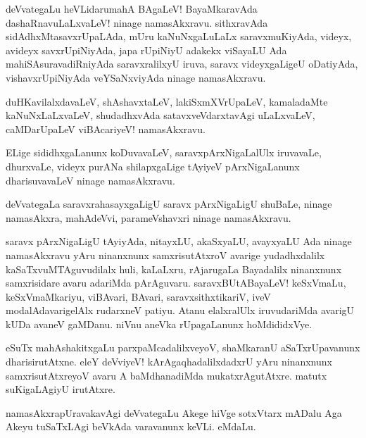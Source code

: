 \begin{mng}
deVvategaLu heVLidaru\mdash mahA BAgaLeV! BayaMkaravAda dashaRnavuLaLxvaLeV! ninage namasAkxravu. sithxravAda sidAdhxMtasavxrUpaLAda, mUru kaNuNxgaLuLaLx saravxmuKiyAda, videyx, avideyx savxrUpiNiyAda, japa rUpiNiyU adakekx viSayaLU Ada mahiSAsuravadiRniyAda saravxralilxyU iruva, saravx videyxgaLigeU oDatiyAda, vishavxrUpiNiyAda veYSaNxviyAda ninage namasAkxravu.
\end{mng}

\begin{mng}
duHKavilalxdavaLeV, shAshavxtaLeV, lakiSxmXVrUpaLeV, kamaladaMte kaNuNxLaLxvaLeV, shudadhxvAda satavxveVdarxtavAgi uLaLxvaLeV, caMDarUpaLeV viBAcariyeV! namasAkxravu.
\end{mng}

\begin{mng}
ELige sididhxgaLanunx koDuvavaLeV, saravxpArxNigaLalUlx iruvavaLe, dhurxvaLe, videyx purANa shilapxgaLige tAyiyeV pArxNigaLanunx dharisuvavaLeV ninage namasAkxravu.
\end{mng}

\begin{mng}
deVvategaLa saravxrahasayxgaLigU saravx pArxNigaLigU shuBaLe, ninage namasAkxra, mahAdeVvi, parameVshavxri ninage namasAkxravu.
\end{mng}

\begin{mng}
saravx pArxNigaLigU tAyiyAda, nitayxLU, akaSxyaLU, avayxyaLU Ada ninage namasAkxravu yAru ninanxnunx samxrisutAtxroV avarige yudadhxdalilx kaSaTxvuMTAguvudilalx huli, kaLaLxru, rAjarugaLa Bayadalilx ninanxnunx samxrisidare avaru adariMda pArAguvaru. saravxBUtABayaLeV! keSxVmaLu, keSxVmaMkariyu, viBAvari, BAvari, saravxsithxtikariV, iveV modalAdavarigelAlx rudarxneV patiyu. Atanu elalxralUlx iruvudariMda avarigU kUDa avaneV gaMDanu. niVnu aneVka rUpagaLanunx hoMdididxVye.
\end{mng}

\begin{mng}
eSuTx mahAshakitxgaLu parxpaMcadalilxveyoV, shaMkaranU aSaTxrUpavanunx dharisirutAtxne. eleY deVviyeV! kArAgaqhadalilxdadxrU yAru ninanxnunx samxrisutAtxreyoV avaru A baMdhanadiMda mukatxrAgutAtxre. matutx suKigaLAgiyU irutAtxre.
\end{mng}

\begin{mng}
namasAkxrapUravakavAgi deVvategaLu Akege hiVge sotxVtarx mADalu Aga Akeyu tuSaTxLAgi beVkAda varavanunx keVLi. eMdaLu.
\end{mng}

